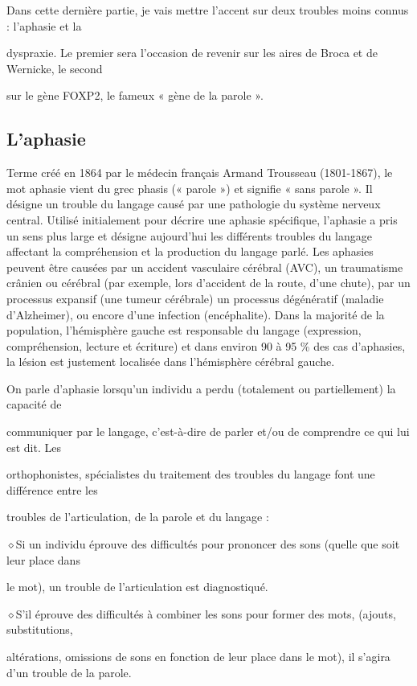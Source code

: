 Dans cette dernière partie, je vais mettre l'accent sur deux troubles moins connus : l'aphasie et la

dyspraxie. Le premier sera l'occasion de revenir sur les aires de Broca et de Wernicke, le second

sur le gène FOXP2, le fameux « gène de la parole ».

\subsection{L’aphasie}

Terme créé en 1864 par le médecin français Armand Trousseau (1801-1867), le mot aphasie vient
du grec phasis (« parole ») et signifie « sans parole ». Il désigne un trouble du langage causé par
une pathologie du système nerveux central. Utilisé initialement pour décrire une aphasie spécifique,
l'aphasie a pris un sens plus large et désigne aujourd'hui les différents troubles du langage affectant la
compréhension et la production du langage parlé. Les aphasies peuvent être causées par un accident
vasculaire cérébral (AVC), un traumatisme crânien ou cérébral (par exemple, lors d'accident de la
route, d'une chute), par un processus expansif (une tumeur cérébrale) un processus dégénératif (maladie
d'Alzheimer), ou encore d'une infection (encéphalite).
Dans la majorité de la population, l'hémisphère gauche est responsable du langage (expression,
compréhension, lecture et écriture) et dans environ 90 à 95 \% des cas d’aphasies, la lésion est
justement localisée dans l'hémisphère cérébral gauche.

On parle d'aphasie lorsqu'un individu a perdu (totalement ou partiellement) la capacité de

communiquer par le langage, c'est-à-dire de parler et/ou de comprendre ce qui lui est dit. Les


orthophonistes, spécialistes du traitement des troubles du langage font une différence entre les

troubles de l'articulation, de la parole et du langage :

\noindent\textcolor{BellaTeal}{$\diamond$}\enspace Si un individu éprouve des difficultés pour prononcer des sons (quelle que soit leur place dans\par
le mot), un trouble de l’articulation est diagnostiqué.

\noindent\textcolor{BellaTeal}{$\diamond$}\enspace S'il éprouve des difficultés à combiner les sons pour former des mots, (ajouts, substitutions,\par
altérations, omissions de sons en fonction de leur place dans le mot), il s'agira d’un trouble de
la parole.

